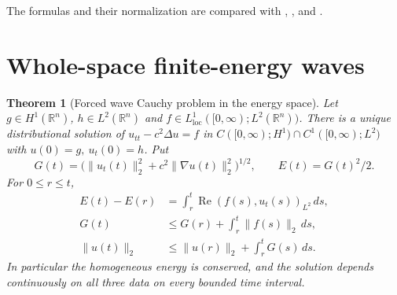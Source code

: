 \documentclass[11pt,oneside,openany]{book}
\theoremstyle{plain}
\newtheorem{theorem}{Theorem}[chapter]
\theoremstyle{definition}
\theoremstyle{remark}
\begin{document}
The formulas and their normalization are compared with
\cite[Sections 2.4.1--2.4.2]{Evans},
\cite[Chapter 5, Section 1]{John}, and
\cite[Sections 2.1 and 9.2]{Strauss}.

\section{Whole-space finite-energy waves}\label{pde:W03}

\begin{theorem}[Forced wave Cauchy problem in the energy space]\label{thm:pde-wave-energy}
Let \(g\in H^1(\mathbb R^n)\), \(h\in L^2(\mathbb R^n)\) and
\(f\in L^1_{\mathrm{loc}}([0,\infty);L^2(\mathbb R^n))\).
There is a unique distributional solution of
\(u_{tt}-c^2\Delta u=f\) in
\(C([0,\infty);H^1)\cap C^1([0,\infty);L^2)\)
with \(u(0)=g,\ u_t(0)=h\). Put
\[
 G(t)=\bigl(\|u_t(t)\|_2^2+c^2\|\nabla u(t)\|_2^2\bigr)^{1/2},
 \qquad E(t)=G(t)^2/2 .
\]
For \(0\leq r\leq t\),
\begin{align*}
 E(t)-E(r)&=\int_r^t \operatorname{Re}(f(s),u_t(s))_{L^2}\,ds,\\
 G(t)&\leq G(r)+\int_r^t\|f(s)\|_2\,ds,\\
 \|u(t)\|_2&\leq \|u(r)\|_2+\int_r^t G(s)\,ds .
\end{align*}
In particular the homogeneous energy is conserved, and the
solution depends continuously on all three data on every bounded
time interval.
\end{theorem}
\end{document}
